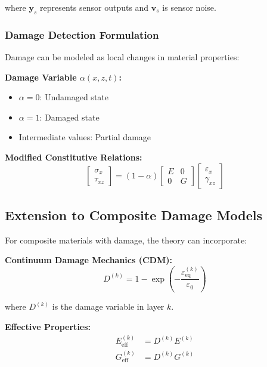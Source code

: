 \documentclass[12pt,a4paper]{article}
\begin{document}
where $\mathbf{y}_s$ represents sensor outputs and $\mathbf{v}_s$ is sensor noise.

\subsubsection{Damage Detection Formulation}

Damage can be modeled as local changes in material properties:

\textbf{Damage Variable $\alpha(x,z,t)$:}
\begin{itemize}
\item $\alpha = 0$: Undamaged state
\item $\alpha = 1$: Damaged state
\item Intermediate values: Partial damage
\end{itemize}

\textbf{Modified Constitutive Relations:}
\begin{equation}
\begin{bmatrix}
\sigma_x \\ \tau_{xz}
\end{bmatrix}
=
(1-\alpha)
\begin{bmatrix}
E & 0 \\
0 & G
\end{bmatrix}
\begin{bmatrix}
\varepsilon_x \\ \gamma_{xz}
\end{bmatrix}
\end{equation}

\subsection{Extension to Composite Damage Models}

For composite materials with damage, the theory can incorporate:

\textbf{Continuum Damage Mechanics (CDM):}
\begin{equation}
D^{(k)} = 1 - \exp\left(-\frac{\varepsilon_{\text{eq}}^{(k)}}{\varepsilon_0}\right)
\end{equation}

where $D^{(k)}$ is the damage variable in layer $k$.

\textbf{Effective Properties:}
\begin{align}
E_{\text{eff}}^{(k)} &= D^{(k)} E^{(k)} \\
G_{\text{eff}}^{(k)} &= D^{(k)} G^{(k)}
\end{align}
\end{document}

